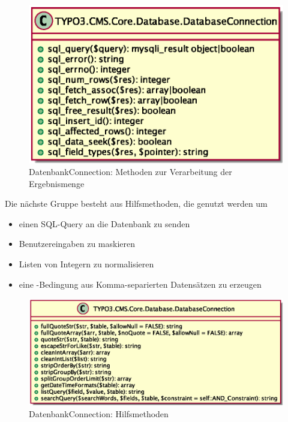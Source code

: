 \begin{figure}[H]
\centering
\includegraphics[scale=0.65]{gfx/uml/DatabaseConnectionFetchMethods.eps}
\caption{DatenbankConnection: Methoden zur Verarbeitung der Ergebnismenge}
\label{fig:databaseConnectionWithResultsetsMethods}
\end{figure}

Die nächste Gruppe besteht aus Hilfsmethoden, die genutzt werden um

\begin{itemize}
	\item einen SQL-Query an die Datenbank zu senden
	\item Benutzereingaben zu maskieren
	\item Listen von Integern zu normalisieren
	\item eine -Bedingung aus Komma-separierten Datensätzen zu erzeugen
\end{itemize}

\begin{figure}[H]
\centering
\includegraphics[scale=0.65]{gfx/uml/DatabaseConnectionHelperMethods.eps}
\caption{DatenbankConnection: Hilfsmethoden}
\label{fig:databaseConnectionWithHelperMethods}
\end{figure}

